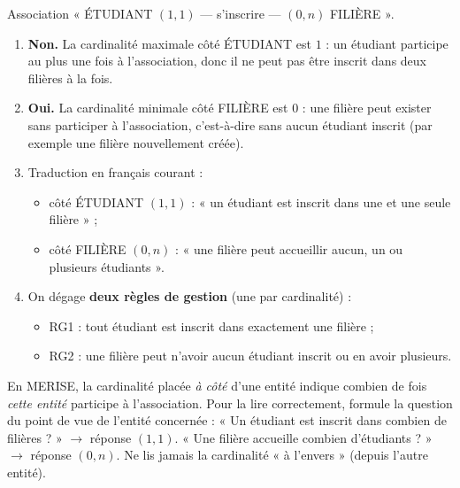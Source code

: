 \documentclass[11pt]{article}
\begin{document}
\begin{corrige}
Association « ÉTUDIANT $(1,1)$ --- s'inscrire --- $(0,n)$ FILIÈRE ».
\begin{enumerate}
\item \textbf{Non.} La cardinalité maximale côté ÉTUDIANT est $1$ : un étudiant participe au plus une fois à l'association, donc il ne peut pas être inscrit dans deux filières à la fois.
\item \textbf{Oui.} La cardinalité minimale côté FILIÈRE est $0$ : une filière peut exister sans participer à l'association, c'est-à-dire sans aucun étudiant inscrit (par exemple une filière nouvellement créée).
\item Traduction en français courant :
\begin{itemize}
\item côté ÉTUDIANT $(1, 1)$ : « un étudiant est inscrit dans une et une seule filière » ;
\item côté FILIÈRE $(0, n)$ : « une filière peut accueillir aucun, un ou plusieurs étudiants ».
\end{itemize}
\item On dégage \textbf{deux règles de gestion} (une par cardinalité) :
\begin{itemize}
\item RG1 : tout étudiant est inscrit dans exactement une filière ;
\item RG2 : une filière peut n'avoir aucun étudiant inscrit ou en avoir plusieurs.
\end{itemize}
\end{enumerate}
\end{corrige}

\begin{attention}
En MERISE, la cardinalité placée \emph{à côté} d'une entité indique combien de fois \emph{cette entité} participe à l'association. Pour la lire correctement, formule la question du point de vue de l'entité concernée : « Un étudiant est inscrit dans combien de filières ? » $\rightarrow$ réponse $(1,1)$. « Une filière accueille combien d'étudiants ? » $\rightarrow$ réponse $(0,n)$. Ne lis jamais la cardinalité « à l'envers » (depuis l'autre entité).
\end{attention}
\end{document}
